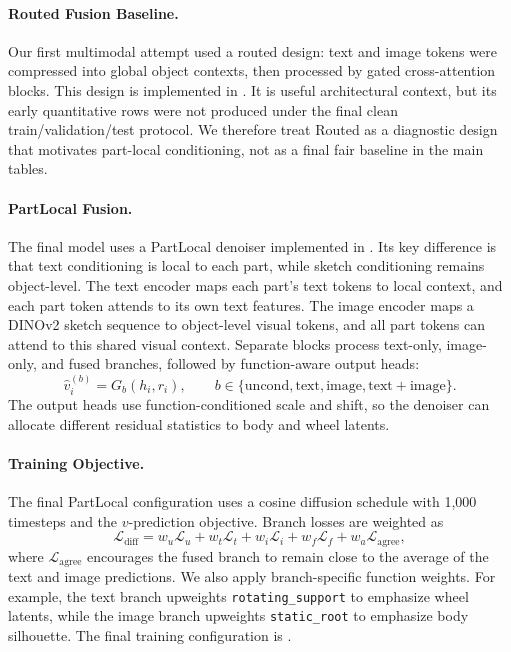 \documentclass[10pt]{article}
\begin{document}
\paragraph{Routed Fusion Baseline.}
Our first multimodal attempt used a routed design: text and image tokens were compressed into global object contexts, then processed by gated cross-attention blocks. This design is implemented in . It is useful architectural context, but its early quantitative rows were not produced under the final clean train/validation/test protocol. We therefore treat Routed as a diagnostic design that motivates part-local conditioning, not as a final fair baseline in the main tables.

\paragraph{PartLocal Fusion.}
The final model uses a PartLocal denoiser implemented in . Its key difference is that text conditioning is local to each part, while sketch conditioning remains object-level. The text encoder maps each part's text tokens to local context, and each part token attends to its own text features. The image encoder maps a DINOv2 sketch sequence to object-level visual tokens, and all part tokens can attend to this shared visual context. Separate blocks process text-only, image-only, and fused branches, followed by function-aware output heads:
\begin{equation}
    \hat{v}^{(b)}_i = G_b(h_i, r_i), \qquad b \in \{\mathrm{uncond}, \mathrm{text}, \mathrm{image}, \mathrm{text+image}\}.
\end{equation}
The output heads use function-conditioned scale and shift, so the denoiser can allocate different residual statistics to body and wheel latents.

\paragraph{Training Objective.}
The final PartLocal configuration uses a cosine diffusion schedule with 1,000 timesteps and the $v$-prediction objective. Branch losses are weighted as
\begin{equation}
\mathcal{L}_{\mathrm{diff}} =
w_u \mathcal{L}_u +
w_t \mathcal{L}_t +
w_i \mathcal{L}_i +
w_f \mathcal{L}_f +
w_a \mathcal{L}_{\mathrm{agree}},
\end{equation}
where $\mathcal{L}_{\mathrm{agree}}$ encourages the fused branch to remain close to the average of the text and image predictions. We also apply branch-specific function weights. For example, the text branch upweights \texttt{rotating\_support} to emphasize wheel latents, while the image branch upweights \texttt{static\_root} to emphasize body silhouette. The final training configuration is .
\end{document}
